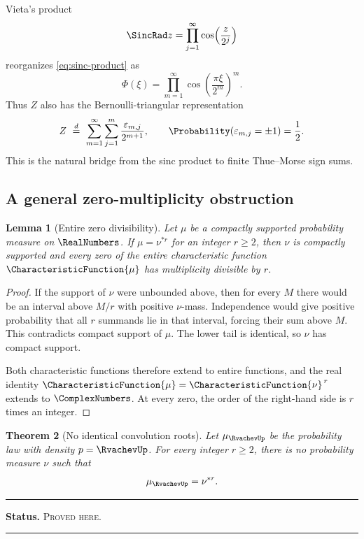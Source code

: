 \documentclass[11pt,oneside]{article}
\newtheorem{theorem}{Theorem}[section]
\newtheorem{lemma}[theorem]{Lemma}
\theoremstyle{definition}
\theoremstyle{remark}
\newenvironment{boxedremark}{%
  \par\smallskip\noindent\begin{center}\begin{minipage}{0.94\textwidth}%
  \color{black}\hrule\vspace{0.6em}\small
}{%
  \vspace{0.6em}\hrule\end{minipage}\end{center}\smallskip
}
\newcommand{\ProvedHere}{\textsc{Proved here}}
\newcommand{\Status}[1]{%
  \begin{boxedremark}\textbf{Status.} #1.\end{boxedremark}}
\begin{document}
Vieta's product
\[
 \SincRad z=\prod_{j=1}^{\infty}\cos\!\left(\frac{z}{2^j}\right)
\]
reorganizes \eqref{eq:sinc-product} as
\begin{equation}\label{eq:cosine-triangle}
 \Phi(\xi)=\prod_{m=1}^{\infty}
 \cos\!\left(\frac{\pi\xi}{2^m}\right)^m.
\end{equation}
Thus $Z$ also has the Bernoulli-triangular representation
\begin{equation}\label{eq:bernoulli-triangle}
 Z\ \stackrel d=\ \sum_{m=1}^{\infty}\sum_{j=1}^{m}
 \frac{\varepsilon_{m,j}}{2^{m+1}},
 \qquad \Probability(\varepsilon_{m,j}=\pm1)=\frac12.
\end{equation}
This is the natural bridge from the sinc product to finite Thue--Morse sign sums.

\subsection{A general zero-multiplicity obstruction}
\begin{lemma}[Entire zero divisibility]\label{lem:zero-divisibility}
Let $\mu$ be a compactly supported probability measure on $\RealNumbers$.  If
$\mu=\nu^{*r}$ for an integer $r\ge2$, then $\nu$ is compactly supported and every
zero of the entire characteristic function $\CharacteristicFunction{\mu}$ has multiplicity
divisible by $r$.
\end{lemma}

\begin{proof}
If the support of $\nu$ were unbounded above, then for every $M$ there would be an
interval above $M/r$ with positive $\nu$-mass.  Independence would give positive
probability that all $r$ summands lie in that interval, forcing their sum above
$M$.  This contradicts compact support of $\mu$.  The lower tail is identical, so
$\nu$ has compact support.

Both characteristic functions therefore extend to entire functions, and the real
identity $\CharacteristicFunction{\mu}=\CharacteristicFunction{\nu}^{\,r}$ extends to $\ComplexNumbers$.  At every zero, the order
of the right-hand side is $r$ times an integer.
\end{proof}

\begin{theorem}[No identical convolution roots]\label{thm:rootless}
Let $\mu_{\RvachevUp}$ be the probability law with density $p=\RvachevUp$.  For every integer
$r\ge2$, there is no probability measure $\nu$ such that
\begin{equation}
 \mu_{\RvachevUp}=\nu^{*r}.
\end{equation}
\end{theorem}
\Status{\ProvedHere}
\end{document}
